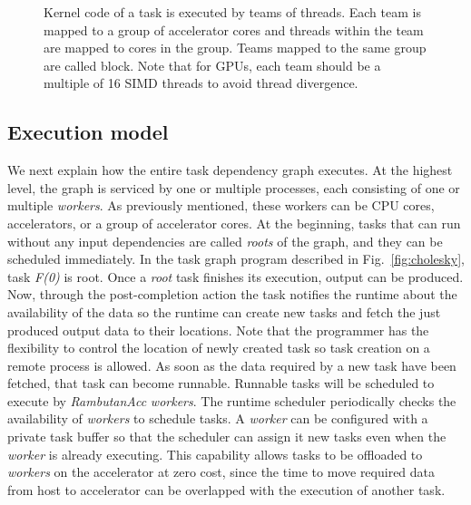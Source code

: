 \begin{figure}[htp]

\caption{Kernel code of a task is executed by teams of threads. Each team is mapped to a group of accelerator cores and threads within the team are mapped to cores in the group. Teams mapped to the same group are called block. Note that for GPUs, each team should be a multiple of 16 SIMD threads to avoid thread divergence.}
\label{fig:program}
\end{figure}


\subsection{Execution model}
We next explain how the entire task dependency graph executes.
At the highest level, the graph is serviced by one or multiple processes, each consisting of one or multiple {\em workers}.
As previously mentioned, these workers can be CPU cores, accelerators, or a group of accelerator cores.
At the beginning, tasks that can run without any input dependencies are called {\em roots} of the graph, and they can be scheduled immediately.
In the task graph program described in Fig.~\ref{fig:cholesky}, task {\em F(0)} is root.
Once a {\em root} task finishes its execution, output can be produced.
Now, through the post-completion action the task notifies the runtime about the availability of the data so the runtime can create new tasks and fetch the just produced output data to their locations.
Note that the programmer has the flexibility to control the location of newly created task so task creation on a remote process is allowed.
As soon as the data required by a new task have been fetched, that task can become runnable.
Runnable tasks will be scheduled to execute by {\em RambutanAcc} {\em workers}.
The runtime scheduler periodically checks the availability of {\em workers} to schedule tasks. 
A {\em worker} can be configured with a private task buffer so that the scheduler can assign it new tasks even when the {\em worker} is already executing. 
This capability allows tasks to be offloaded to {\em workers} on the accelerator at zero cost, since the time to move required data from host to accelerator can be overlapped with the execution of another task.



